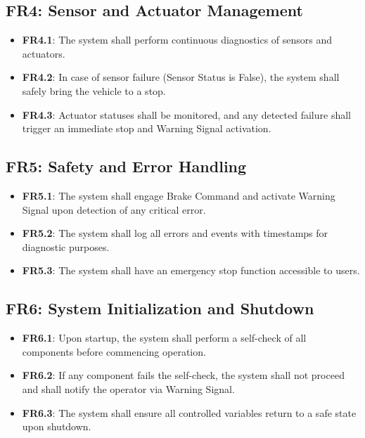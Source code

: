 \documentclass[12pt]{article}
\begin{document}
\subsection*{FR4: Sensor and Actuator Management}

\begin{itemize}
    \item \textbf{FR4.1}: The system shall perform continuous diagnostics of sensors and actuators.
    \item \textbf{FR4.2}: In case of sensor failure (Sensor Status is False), the system shall safely bring the vehicle to a stop.
    \item \textbf{FR4.3}: Actuator statuses shall be monitored, and any detected failure shall trigger an immediate stop and Warning Signal activation.
\end{itemize}

\subsection*{FR5: Safety and Error Handling}

\begin{itemize}
    \item \textbf{FR5.1}: The system shall engage Brake Command and activate Warning Signal upon detection of any critical error.
    \item \textbf{FR5.2}: The system shall log all errors and events with timestamps for diagnostic purposes.
    \item \textbf{FR5.3}: The system shall have an emergency stop function accessible to users.
\end{itemize}

\subsection*{FR6: System Initialization and Shutdown}

\begin{itemize}
    \item \textbf{FR6.1}: Upon startup, the system shall perform a self-check of all components before commencing operation.
    \item \textbf{FR6.2}: If any component fails the self-check, the system shall not proceed and shall notify the operator via Warning Signal.
    \item \textbf{FR6.3}: The system shall ensure all controlled variables return to a safe state upon shutdown.
\end{itemize}
\end{document}
